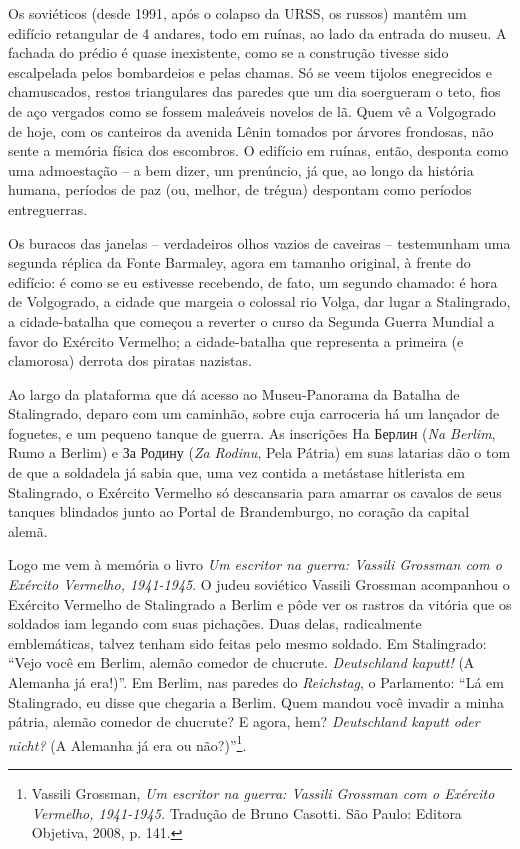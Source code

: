 Os soviéticos (desde 1991, após o colapso da URSS, os russos) mantêm um
edifício retangular de 4 andares, todo em ruínas, ao lado da entrada do
museu. A fachada do prédio é quase inexistente, como se a construção
tivesse sido escalpelada pelos bombardeios e pelas chamas. Só se veem
tijolos enegrecidos e chamuscados, restos triangulares das paredes que
um dia soergueram o teto, fios de aço vergados como se fossem maleáveis
novelos de lã. Quem vê a Volgogrado de hoje, com os canteiros da avenida
Lênin tomados por árvores frondosas, não sente a memória física dos
escombros. O edifício em ruínas, então, desponta como uma admoestação --
a bem dizer, um prenúncio, já que, ao longo da história humana, períodos
de paz (ou, melhor, de trégua) despontam como períodos entreguerras.

Os buracos das janelas -- verdadeiros olhos vazios de caveiras --
testemunham uma segunda réplica da Fonte Barmaley, agora em tamanho
original, à frente do edifício: é como se eu estivesse recebendo, de
fato, um segundo chamado: é hora de Volgogrado, a cidade que margeia o
colossal rio Volga, dar lugar a Stalingrado, a cidade-batalha que
começou a reverter o curso da Segunda Guerra Mundial a favor do Exército
Vermelho; a cidade-batalha que representa a primeira (e clamorosa)
derrota dos piratas nazistas.

Ao largo da plataforma que dá acesso ao Museu-Panorama da Batalha de
Stalingrado, deparo com um caminhão, sobre cuja carroceria há um
lançador de foguetes, e um pequeno tanque de guerra. As inscrições Ha
Берлин (\emph{Na Berlim}, Rumo a Berlim) e За Родину (\emph{Za Rodinu},
Pela Pátria) em suas latarias dão o tom de que a soldadela já sabia que,
uma vez contida a metástase hitlerista em Stalingrado, o Exército
Vermelho só descansaria para amarrar os cavalos de seus tanques
blindados junto ao Portal de Brandemburgo, no coração da capital alemã.

Logo me vem à memória o livro \emph{Um escritor na guerra: Vassili
Grossman com o Exército Vermelho, 1941-1945}. O judeu soviético Vassili
Grossman acompanhou o Exército Vermelho de Stalingrado a Berlim e pôde
ver os rastros da vitória que os soldados iam legando com suas
pichações. Duas delas, radicalmente emblemáticas, talvez tenham sido
feitas pelo mesmo soldado. Em Stalingrado: ``Vejo você em Berlim, alemão
comedor de chucrute. \emph{Deutschland kaputt!} (A Alemanha já era!)''.
Em Berlim, nas paredes do \emph{Reichstag}, o Parlamento: ``Lá em
Stalingrado, eu disse que chegaria a Berlim. Quem mandou você invadir a
minha pátria, alemão comedor de chucrute? E agora, hem?
\emph{Deutschland kaputt oder nicht?} (A Alemanha já era ou
não?)''\footnote{Vassili Grossman, \emph{Um escritor na guerra: Vassili
  Grossman com o Exército Vermelho, 1941-1945.} Tradução de Bruno
  Casotti. São Paulo: Editora Objetiva, 2008, p. 141.}.

